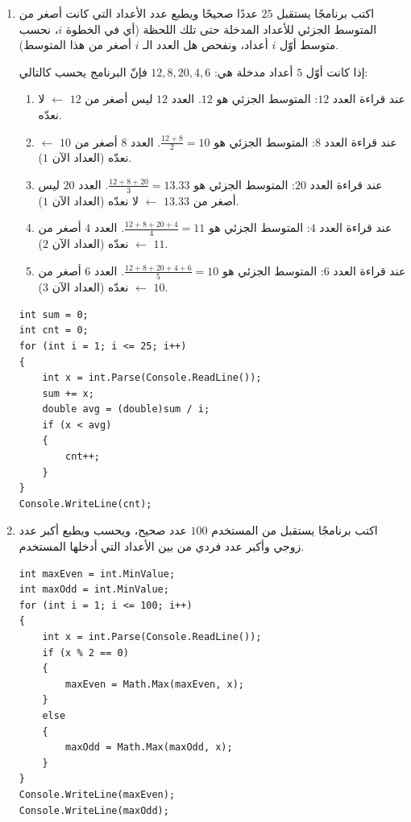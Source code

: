\documentclass[14pt]{extarticle}
\begin{document}
\begin{enumerate}[resume, itemsep=2em]
\item اكتب برنامجًا يستقبل $25$ عددًا صحيحًا ويطبع عدد الأعداد التي كانت أصغر من المتوسط الجزئي للأعداد المدخلة حتى تلك اللحظة (أي في الخطوة $i$، نحسب متوسط أوّل $i$ أعداد، ونفحص هل العدد الـ $i$ أصغر من هذا المتوسط).
\ifdetailed
\begin{boxExample}
إذا كانت أوّل $5$ أعداد مدخلة هي: $12, 8, 20, 4, 6$ فإنّ البرنامج يحسب كالتالي:
\begin{enumerate}[label=(\arabic*), nosep]
    \item عند قراءة العدد $12$: المتوسط الجزئي هو $12$. العدد $12$ ليس أصغر من $12$ $\leftarrow$ لا نعدّه.
    \item عند قراءة العدد $8$: المتوسط الجزئي هو $\frac{12 + 8}{2} = 10$. العدد $8$ أصغر من $10$ $\leftarrow$ نعدّه (العداد الآن $1$).
    \item عند قراءة العدد $20$: المتوسط الجزئي هو $\frac{12 + 8 + 20}{3} = 13.33$. العدد $20$ ليس أصغر من $13.33$ $\leftarrow$ لا نعدّه (العداد الآن $1$).
    \item عند قراءة العدد $4$: المتوسط الجزئي هو $\frac{12 + 8 + 20 + 4}{4} = 11$. العدد $4$ أصغر من $11$ $\leftarrow$ نعدّه (العداد الآن $2$).
    \item عند قراءة العدد $6$: المتوسط الجزئي هو $\frac{12 + 8 + 20 + 4 + 6}{5} = 10$. العدد $6$ أصغر من $10$ $\leftarrow$ نعدّه (العداد الآن $3$).
\end{enumerate}
\end{boxExample}
\fi
\ifwithsols
\begin{boxSolution}
\begin{english}
\begin{verbatim}
int sum = 0;
int cnt = 0;
for (int i = 1; i <= 25; i++)
{
    int x = int.Parse(Console.ReadLine());
    sum += x;
    double avg = (double)sum / i;
    if (x < avg)
    {
        cnt++;
    }
}
Console.WriteLine(cnt);
\end{verbatim}
\end{english}
\end{boxSolution}
\fi
\filbreak

\item اكتب برنامجًا يستقبل من المستخدم $100$ عدد صحيح، ويحسب ويطبع أكبر عدد زوجي وأكبر عدد فردي من بين الأعداد التي أدخلها المستخدم.
\ifwithsols
\begin{boxSolution}
\begin{english}
\begin{verbatim}
int maxEven = int.MinValue;
int maxOdd = int.MinValue;
for (int i = 1; i <= 100; i++)
{
    int x = int.Parse(Console.ReadLine());
    if (x % 2 == 0)
    {
        maxEven = Math.Max(maxEven, x);
    }
    else
    {
        maxOdd = Math.Max(maxOdd, x);
    }
}
Console.WriteLine(maxEven);
Console.WriteLine(maxOdd);
\end{verbatim}
\end{english}
\end{boxSolution}
\fi
\filbreak


\end{enumerate}
\end{document}
